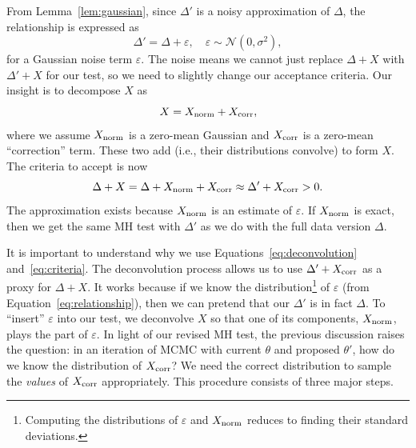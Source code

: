 \documentclass{article}
\begin{document}
From Lemma~\ref{lem:gaussian}, since $\Delta'$ is a noisy approximation of $\Delta$, the
relationship is expressed as
\begin{equation}\label{eq:relationship}
\Delta' = \Delta + \varepsilon, \quad \varepsilon \sim \mathcal{N}(0, \sigma^2),
\end{equation}
for a Gaussian noise term $\varepsilon$.  The noise means we cannot just replace $\Delta+X$ with
$\Delta'+X$ for our test, so we need to slightly change our acceptance criteria. Our insight is to
decompose $X$ as
\begin{equation}\label{eq:deconvolution}
X = X_{\rm norm}+X_{\rm corr},
\end{equation}
where we assume $X_{\rm norm}$ is a zero-mean Gaussian and $X_{\rm corr}$ is a zero-mean
``correction'' term.  These two add (i.e., their distributions convolve) to form $X$. The criteria
to accept is now
\begin{equation}\label{eq:criteria}
\Delta + X = \Delta + X_{\rm norm} + X_{\rm corr} \approx \Delta' + X_{\rm corr} >0.
\end{equation}
The approximation exists because $X_{\rm norm}$ is an estimate of $\varepsilon$. If $X_{\rm norm}$
is exact, then we get the same MH test with $\Delta'$ as we do with the full data version $\Delta$.

It is important to understand why we use Equations~\ref{eq:deconvolution} and~\ref{eq:criteria}. The
deconvolution process allows us to use $\Delta' + X_{\rm corr}$ as a proxy for $\Delta + X$. It
works because if we know the distribution\footnote{Computing the distributions of $\varepsilon$ and
$X_{\rm norm}$ reduces to finding their standard deviations.} of $\varepsilon$ (from
Equation~\ref{eq:relationship}), then we can pretend that our $\Delta'$ is in fact $\Delta$. To
``insert'' $\varepsilon$ into our test, we deconvolve $X$ so that one of its components, $X_{\rm
norm}$, plays the part of $\varepsilon$. In light of our revised MH test, the previous discussion
raises the question: in an iteration of MCMC with current $\theta$ and proposed $\theta'$, how do
we know the distribution of $X_{\rm corr}$? We need the correct distribution to sample the
\emph{values} of $X_{\rm corr}$ appropriately. This procedure consists of three major steps.
\end{document}
